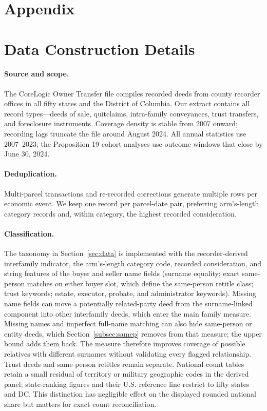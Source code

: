 \clearpage
\setcounter{table}{0}
\renewcommand{\thetable}{A\arabic{table}}
\setcounter{figure}{0}
\renewcommand{\thefigure}{A\arabic{figure}}

\section*{Appendix}

\section{Data Construction Details}\label{app:data}

\paragraph{Source and scope.} The CoreLogic Owner Transfer file compiles
recorded deeds from county recorder offices in all fifty states and the
District of Columbia. Our extract contains all record types---deeds of sale,
quitclaims, intra-family conveyances, trust transfers, and foreclosure
instruments. Coverage density is stable from 2007 onward; recording lags
truncate the file around August 2024. All annual statistics use 2007--2023;
the Proposition 19 cohort analyses use outcome windows that close by June 30,
2024.

\paragraph{Deduplication.} Multi-parcel transactions and re-recorded
corrections generate multiple rows per economic event. We keep one record per
parcel-date pair, preferring arm's-length category records and, within
category, the highest recorded consideration.

\paragraph{Classification.} The taxonomy in Section~\ref{sec:data} is
implemented with the recorder-derived interfamily indicator, the
arm's-length category code, recorded consideration, and
string features of the buyer and seller name fields (surname equality;
exact same-person matches on either buyer slot, which define the
same-person retitle class; trust keywords; estate, executor, probate, and
administrator keywords).
Missing name fields can move a potentially related-party deed from the surname-linked component into other interfamily deeds, which enter the main family measure. Missing names and imperfect full-name matching can also hide same-person or entity deeds, which Section~\ref{subsec:samep} removes from that measure; the upper bound adds them back. The measure therefore improves coverage of possible relatives with different surnames without validating every flagged relationship. Trust deeds and same-person retitles remain separate. National count tables retain a small residual of territory or military geographic codes in the derived panel; state-ranking figures and their U.S. reference line restrict to fifty states and DC. This distinction has negligible effect on the displayed rounded national share but matters for exact count reconciliation.


